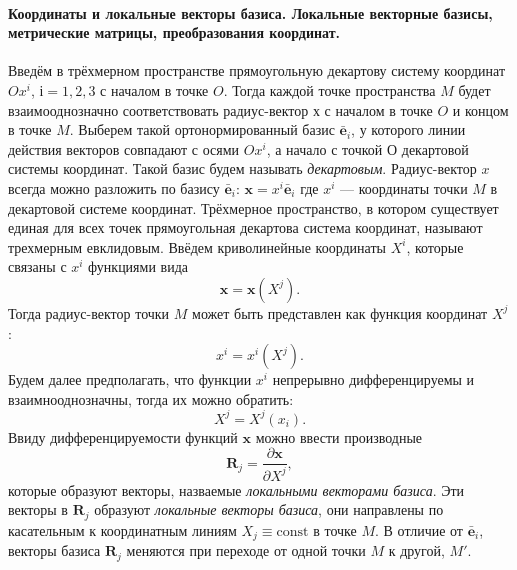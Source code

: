 \paragraph{ Координаты и локальные векторы базиса. Локальные векторные базисы, метрические матрицы, преобразования координат.}
Введём в трёхмерном пространстве прямоугольную декартову систему координат
$Ox^i$, $і= 1, 2, 3$ с началом в точке $ O $. Тогда каждой точке пространства
$M$ будет взаимооднозначно соответствовать радиус-вектор $х$ с началом в точке
$O$ и концом в точке $M$. Выберем такой ортонормированный базис
$\bar{\textbf{e}}_i$, у которого линии действия векторов совпадают с осями
$Ox^i$, а начало с точкой $О$ декартовой системы координат. Такой базис будем
называть \emph{декартовым}. Радиус-вектор $x$ всегда можно разложить по базису
$\bar{\textbf{e}}_i$: $\label{eq:11}
\textbf{x} = x^i\bar{\textbf{e}}_i$ где $x^i$ --- координаты точки $M$ в
декартовой системе координат. Трёхмерное пространство, в котором существует
единая для всех точек прямоугольная декартова система координат, называют
трехмерным евклидовым.
Ввёдем криволинейные координаты $X^i$, которые связаны с $x^i$ функциями вида
\begin{equation}
\label{eq:12}
    \textbf{x} = \textbf{x}(X^j).
\end{equation}
Тогда радиус-вектор точки $M$ может быть представлен как функция координат 
$X^j$:
\begin{equation}
\label{eq:13}
    x^i = x^i(X^j).
\end{equation}
Будем далее предполагать, что функции $x^i$ непрерывно дифференцируемы и взаимнооднозначны, тогда их можно обратить:
\begin{equation}
\label{eq:14}
    X^j = X^j(x_i).
\end{equation}
Ввиду дифференцируемости функций $\textbf{x}$ можно ввести производные
\begin{equation}
\label{eq:15}
\textbf{R}_j = \frac{\partial\textbf{x}}{\partial X^j},
\end{equation}
которые образуют векторы, назваемые \emph{локальными векторами базиса}. Эти
векторы в $\textbf{R}_j$ образуют \textit{локальные векторы базиса}, они
направлены по касательным к координатным линиям $X_j\equiv\mathrm{const}$ в точке $M$.
В отличие от $\bar{\mathbf{e}}_i$, векторы базиса $\mathbf{R}_j$  меняются при
переходе от одной точки $M$ к другой, $M'$.




